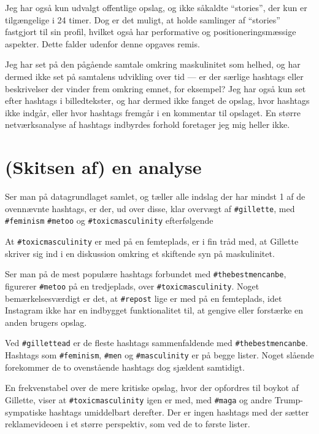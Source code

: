 Jeg har også kun udvalgt offentlige opslag, og ikke såkaldte 
“stories”, der kun er tilgængelige i 24 timer. Dog er det muligt, 
at holde samlinger af “stories” fastgjort til sin profil, hvilket 
også har performative og positioneringsmæssige aspekter. Dette 
falder udenfor denne opgaves remis.

Jeg har set på den pågående samtale omkring maskulinitet som 
helhed, og har dermed ikke set på samtalens udvikling over tid — 
er der særlige hashtags eller beskrivelser der vinder frem omkring 
emnet, for eksempel? Jeg har også kun set efter hashtags i 
billedtekster, og har dermed ikke fanget de opslag, hvor hashtags 
ikke indgår, eller hvor hashtags fremgår i en kommentar til 
opslaget. En større netværksanalyse af hashtags indbyrdes forhold 
foretager jeg mig heller ikke.

\section{(Skitsen af) en analyse}



Ser man på datagrundlaget samlet, og tæller alle indslag der har 
mindst 1 af de ovennævnte hashtags, er der, ud over disse, klar 
overvægt af \texttt{\#gillette}, med \texttt{\#feminism} 
\texttt{\#metoo} og \texttt{\#toxicmasculinity} efterfølgende

At \texttt{\#toxicmasculinity} er med på en femteplads, er i
fin tråd med, at Gillette skriver sig ind i en diskussion omkring
et skiftende syn på maskulinitet.

Ser man på de mest populære hashtags forbundet med
\texttt{\#thebestmencanbe}, figurerer  \texttt{\#metoo} på en
tredjeplads, over \texttt{\#toxicmasculinity}.  Noget 
bemærkelsesværdigt er det, at \texttt{\#repost} lige er med på en
femteplads, idet Instagram ikke har en indbygget funktionalitet
til, at gengive eller forstærke en anden brugers opslag.

Ved \texttt{\#gillettead} er de fleste hashtags sammenfaldende med 
\texttt{\#thebestmencanbe}. Hashtags som \texttt{\#feminism}, 
\texttt{\#men} og \texttt{\#masculinity} er på begge lister. Noget 
slående forekommer de to ovenstående hashtags dog sjældent 
samtidigt.

En frekvenstabel over de mere kritiske opslag, hvor der opfordres 
til boykot af Gillette, viser at \texttt{\#toxicmasculinity} igen 
er med, med \texttt{\#maga} og andre Trump-sympatiske hashtags 
umiddelbart derefter. Der er ingen hashtags med der sætter 
reklamevideoen i et større perspektiv, som ved de to første 
lister.

